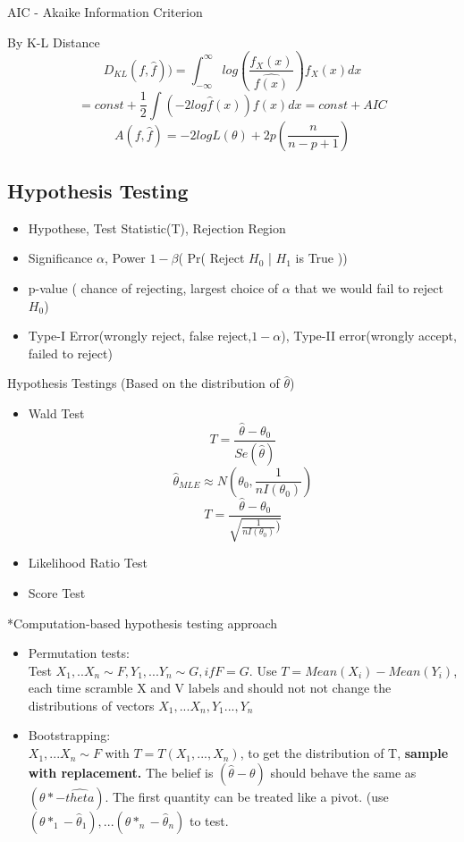 \documentclass[11pt, openany]{book}              %
\begin{document}
AIC - Akaike Information Criterion

By K-L Distance
$$D_{KL}(f,\hat{f})) = \int_{-\infty}^{\infty} log(\frac{f_X(x)}{\hat{f(x)}})f_X(x)dx $$
$$ = const + \frac{1}{2} \int (-2log\hat{f}(x))f(x)dx = const + AIC $$
$$ A(f,\hat{f}) = -2 logL(\theta) + 2 p (\frac{n}{n-p+1})$$

\subsection{Hypothesis Testing}

\begin{itemize}
    \item Hypothese, Test Statistic(T), Rejection Region
    \item Significance $\alpha$, Power $1-\beta$( Pr( Reject $H_0$ | $H_1$ is True ))
    \item p-value ( chance of rejecting, largest choice of $\alpha$ that we would fail to reject $H_0$)   
    \item Type-I Error(wrongly reject, false reject,$1-\alpha$), Type-II error(wrongly accept, failed to reject)
\end{itemize}

Hypothesis Testings (Based on the distribution of $\hat{\theta}$)

\begin{itemize}
    \item Wald Test $$T = \frac{\hat{\theta} - \theta_0}{Se(\hat{\theta})}$$
    $$ \hat{\theta}_{MLE} \approx N(\theta_0, \frac{1}{n I(\theta_0)})$$
   $$T = \frac{\hat{\theta} - \theta_0}{\sqrt{\frac{1}{nI(\theta_0)})}}$$
    \item Likelihood Ratio Test
    \item Score Test
\end{itemize}

*Computation-based hypothesis testing approach

\begin{itemize}
    \item Permutation tests: \\ Test $X_1,..X_n \sim F, Y_1,...Y_n \sim G, if F=G$. Use $T = Mean(X_i )- Mean(Y_i)$, each time scramble X and V labels and should not not change the distributions of vectors $X_1,...X_n, Y_1...,Y_n$
    \item Bootstrapping: \\ $X_1,...X_n \sim F$ with $T = T(X_1,...,X_n)$, to get the distribution of T, \textbf{sample with replacement.} The belief is $(\hat{\theta} - \theta)$ should behave the same as $(\theta* - \hat{theta})$. The first quantity can be treated like a pivot.  (use $(\theta*_1 - \hat{\theta}_1),...(\theta*_n - \hat{\theta}_n)$ to test. 
\end{itemize}
\end{document}
